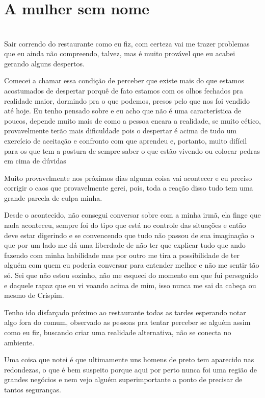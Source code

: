 \newpage


\ifdefined\useChapters
\chapter{A mulher sem nome}
\else
\chapter{}
\fi
Sair correndo do restaurante como eu fiz, com certeza vai me trazer problemas que eu ainda não compreendo, talvez, mas é muito provável que eu acabei gerando alguns despertos. 

Comecei a chamar essa condição de perceber que existe mais do que estamos acostumados de despertar porquê de fato estamos com os olhos fechados pra realidade maior, dormindo pra o que podemos, presos pelo que nos foi vendido até hoje. Eu tenho pensado sobre e eu acho que não é uma característica de poucos, depende muito mais de como a pessoa encara a realidade, se muito cético, provavelmente terão mais dificuldade pois o despertar é acima de tudo um exercício de aceitação e confronto com que aprendeu e, portanto, muito difícil para os que tem a postura de sempre saber o que estão vivendo ou colocar pedras em cima de dúvidas

Muito provavelmente nos próximos dias alguma coisa vai acontecer e eu preciso corrigir o caos que provavelmente gerei, pois, toda a reação disso tudo tem uma grande parcela de culpa minha.

Desde o acontecido, não consegui conversar sobre com a minha irmã, ela finge que nada aconteceu, sempre foi do tipo que está no controle das situações e então deve estar digerindo e se convencendo que tudo não passou de sua imaginação o que por um lado me dá uma liberdade de não ter que explicar tudo que ando fazendo com minha habilidade mas por outro me tira a possibilidade de ter alguém com quem eu poderia conversar para entender melhor e não me sentir tão só. Sei que não estou sozinho, não me esqueci do momento em que fui perseguido e daquele rapaz que eu vi voando acima de mim, isso nunca me sai da cabeça ou mesmo de Crispim.

Tenho ido disfarçado próximo ao restaurante todas as tardes esperando notar algo fora do comum, observado as pessoas pra tentar perceber se alguém assim como eu fiz, buscando criar uma realidade alternativa, não se conecta no ambiente.

Uma coisa que notei é que ultimamente uns homens de preto tem aparecido nas redondezas, o que é bem suspeito porque aqui por perto nunca foi uma região de grandes negócios e nem vejo alguém superimportante a ponto de precisar de tantos seguranças.  

